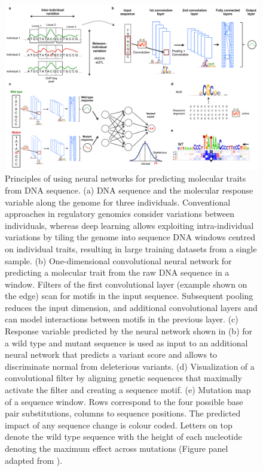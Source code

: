 \begin{figure}[htbp!]
\centering
\includegraphics[width=1.0\textwidth]{genomics}
\caption[Principles of using neural networks for predicting molecular traits from DNA sequence.]{Principles of using neural networks for predicting molecular traits from DNA sequence. (a) DNA sequence and the molecular response variable along the genome for three individuals. Conventional approaches in regulatory genomics consider variations between individuals, whereas deep learning allows exploiting intra-individual variations by tiling the genome into sequence DNA windows centred on individual traits, resulting in large training datasets from a single sample. (b) One-dimensional convolutional neural network for predicting a molecular trait from the raw DNA sequence in a window. Filters of the first convolutional layer (example shown on the edge) scan for motifs in the input sequence. Subsequent pooling reduces the input dimension, and additional convolutional layers and can model interactions between motifs in the previous layer. (c) Response variable predicted by the neural network shown in (b) for a wild type and mutant sequence is used as input to an additional neural network that predicts a variant score and allows to discriminate normal from deleterious variants. (d) Visualization of a convolutional filter by aligning genetic sequences that maximally activate the filter and creating a sequence motif. (e) Mutation map of a sequence window. Rows correspond to the four possible base pair substitutions, columns to sequence positions. The predicted impact of any sequence change is colour coded. Letters on top denote the wild type sequence with the height of each nucleotide denoting the maximum effect across mutations (Figure panel adapted from \citet{alipanahi_predicting_2015}).}
\label{fig:dl_genomics}
\end{figure}

